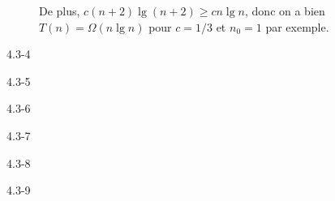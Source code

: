 \begin{description}
\begin{ex}
    De plus, $ c(n+2)\lg(n+2) \ge cn\lg n$, donc on a bien $T(n) = \Omega(n\lg n)$ pour $c = 1/3$ et $n_0 = 1$ par exemple.

  \end{ex}

  \item[4.3-4] {\itshape }
  \item[4.3-5] {\itshape }
  \item[4.3-6] {\itshape }
  \item[4.3-7] {\itshape }
  \item[4.3-8] {\itshape }
  \item[4.3-9] {\itshape }
\end{description}

